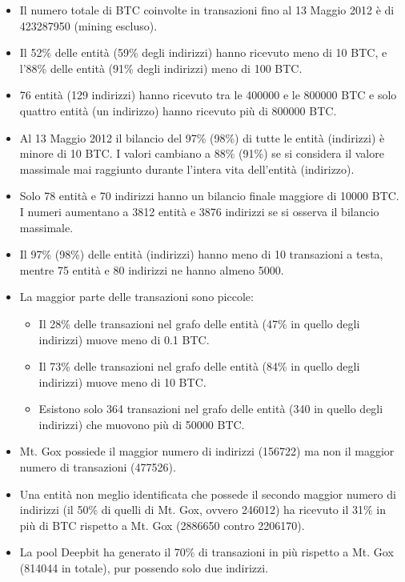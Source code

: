 \begin{itemize}
    \item Il numero totale di BTC coinvolte in transazioni fino al 13 Maggio 2012 è di 423287950 (mining escluso).
    \item Il 52\% delle entità (59\% degli indirizzi) hanno ricevuto meno di 10 BTC, e l'88\% delle entità (91\% degli indirizzi) meno di 100 BTC.
    \item 76 entità (129 indirizzi) hanno ricevuto tra le 400000 e le 800000 BTC e solo quattro entità (un indirizzo) hanno ricevuto più di 800000 BTC.
    \item Al 13 Maggio 2012 il bilancio del 97\% (98\%) di tutte le entità (indirizzi) è minore di 10 BTC. I valori cambiano a 88\% (91\%) se si considera il valore massimale mai raggiunto durante l'intera vita dell'entità (indirizzo).
    \item Solo 78 entità e 70 indirizzi hanno un bilancio finale maggiore di 10000 BTC. I numeri aumentano a 3812 entità e 3876 indirizzi se si osserva il bilancio massimale.
    \item Il 97\% (98\%) delle entità (indirizzi) hanno meno di 10 transazioni a testa, mentre 75 entità e 80 indirizzi ne hanno almeno 5000.
    \item La maggior parte delle transazioni sono piccole:
      \begin{itemize}
          \item Il 28\% delle transazioni nel grafo delle entità (47\% in quello degli indirizzi) muove meno di 0.1 BTC.
          \item Il 73\% delle transazioni nel grafo delle entità (84\% in quello degli indirizzi) muove meno di 10 BTC.
          \item Esistono solo 364 transazioni nel grafo delle entità (340 in quello degli indirizzi) che muovono più di 50000 BTC.
      \end{itemize}
    \item Mt. Gox possiede il maggior numero di indirizzi (156722) ma non il maggior numero di transazioni (477526).
    \item Una entità non meglio identificata che possede il secondo maggior numero di indirizzi (il 50\% di quelli di Mt. Gox, ovvero 246012) ha ricevuto il 31\% in più di BTC rispetto a Mt. Gox (2886650 contro 2206170).
    \item La pool Deepbit ha generato il 70\% di transazioni in più rispetto a Mt. Gox (814044 in totale), pur possendo solo due indirizzi.
\end{itemize}

